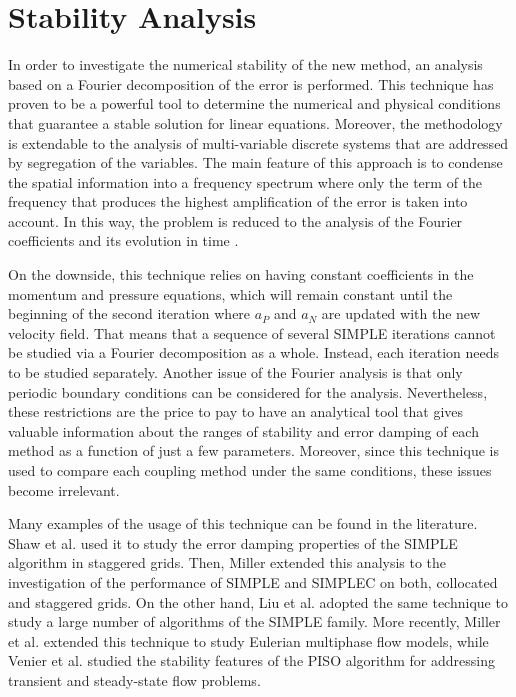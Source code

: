 \documentclass[final,3p,times,11pt,onecolumn]{myElsarticle}
\numberwithin{equation}{section}
\begin{document}
\section{Stability Analysis}
\label{sec:fourier}


In order to investigate the numerical stability of the new method, an analysis based on a Fourier decomposition of the error is performed. This technique has proven to be a powerful tool to determine the numerical and physical conditions that guarantee a stable solution for linear equations. Moreover, the methodology is extendable to the analysis of multi-variable discrete systems that are addressed by segregation of the variables. The main feature of this approach is to condense the spatial information into a frequency spectrum where only the term of the frequency that produces the highest amplification of the error is taken into account. In this way, the problem is reduced to the analysis of the Fourier coefficients and its evolution in time \cite{hirsch}. 

On the downside, this technique relies on having constant coefficients in the momentum and pressure equations, which will remain constant until the beginning of the second iteration where $a_P$ and $a_N$ are updated with the new velocity field. That means that a sequence of several SIMPLE iterations cannot be studied via a Fourier decomposition as a whole. Instead, each iteration needs to be studied separately. Another issue of the Fourier analysis is that only periodic boundary conditions can be considered for the analysis. Nevertheless, these restrictions are the price to pay to have an analytical tool that gives valuable information about the ranges of stability and error damping of each method as a function of just a few parameters. Moreover, since this technique is used to compare each coupling method under the same conditions, these issues become irrelevant.

Many examples of the usage of this technique can be found in the literature. Shaw et al. \cite{shaw} used it to study the error damping properties of the SIMPLE algorithm in staggered grids. Then, Miller \cite{miller1} extended this analysis to the investigation of the performance of SIMPLE and SIMPLEC on both, collocated and staggered grids. On the other hand, Liu et al. \cite{liu} adopted the same technique to study a large number of algorithms of the SIMPLE family. More recently, Miller et al. \cite{miller2} extended this technique to study Eulerian multiphase flow models, while Venier et al. \cite{venier} studied the stability features of the PISO algorithm for addressing transient and steady-state flow problems.
\end{document}
